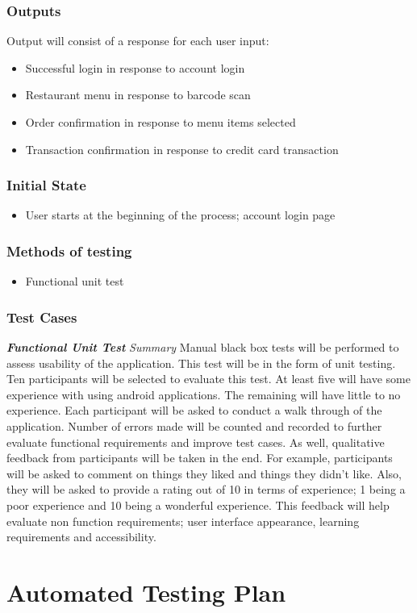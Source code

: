 \documentclass[12pt]{article}
\begin{document}
\subsubsection{Outputs}
Output will consist of a response for each user input:
\begin{itemize}
  \item Successful login in response to account login
  \item Restaurant menu in response to barcode scan
  \item Order confirmation in response to menu items selected
  \item Transaction confirmation in response to credit card transaction
\end{itemize}
\subsubsection{Initial State}
\begin{itemize}
  \item User starts at the beginning of the process; account login page
\end{itemize}
\subsubsection{Methods of testing}
\begin{itemize}
  \item Functional unit test
\end{itemize}
\subsubsection{Test Cases}
\textbf{\textit{Functional Unit Test}}\newline
\newline
\textit{Summary}\newline
Manual black box tests will be performed to assess usability of the application. This test will be in the form of unit testing. Ten participants will be selected to evaluate this test. At least five will have some experience with using android applications. The remaining will have little to no experience. Each participant will be asked to conduct a walk through of the application. Number of errors made will be counted and recorded to further evaluate functional requirements and improve test cases. As well, qualitative feedback from participants will be taken in the end. For example, participants will be asked to comment on things they liked and things they didn't like. Also, they will be asked to provide a rating out of 10 in terms of experience; 1 being a poor experience and 10 being a wonderful experience. This feedback will help evaluate non function requirements; user interface appearance, learning requirements and accessibility. 
\newline

\section{Automated Testing Plan}
\end{document}
